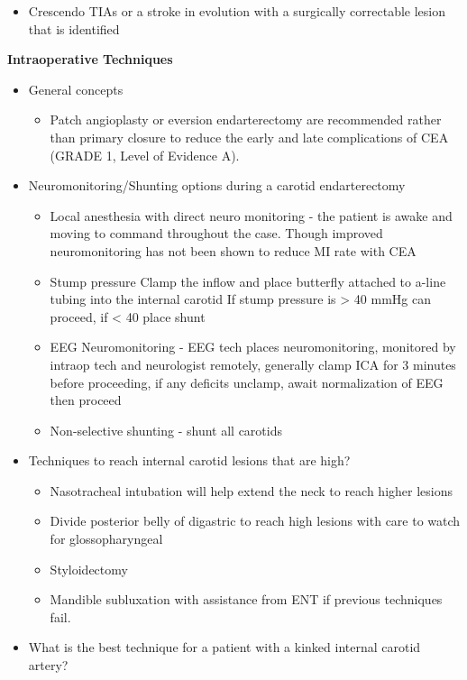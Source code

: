\documentclass[
]{book}
\providecommand{\tightlist}{%
  \setlength{\itemsep}{0pt}\setlength{\parskip}{0pt}}
\begin{document}
\begin{itemize}
  \begin{itemize}
  \tightlist
  \item
    Crescendo TIAs or a stroke in evolution with a surgically
    correctable lesion that is identified
  \end{itemize}
\end{itemize}

\textbf{Intraoperative Techniques}

\begin{itemize}
\item
  General concepts

  \begin{itemize}
  \tightlist
  \item
    Patch angioplasty or eversion endarterectomy are recommended
    rather than primary closure to reduce the early and late
    complications of CEA (GRADE 1, Level of Evidence A).
  \end{itemize}
\item
  Neuromonitoring/Shunting options during a carotid endarterectomy

  \begin{itemize}
  \item
    Local anesthesia with direct neuro monitoring - the patient is
    awake and moving to command throughout the case. Though improved
    neuromonitoring has not been shown to reduce MI rate with CEA
  \item
    Stump pressure Clamp the inflow and place butterfly attached to
    a-line tubing into the internal carotid If stump pressure is \textgreater{}
    40 mmHg can proceed, if \textless{} 40 place shunt
  \item
    EEG Neuromonitoring - EEG tech places neuromonitoring, monitored
    by intraop tech and neurologist remotely, generally clamp ICA
    for 3 minutes before proceeding, if any deficits unclamp, await
    normalization of EEG then proceed
  \item
    Non-selective shunting - shunt all carotids
  \end{itemize}
\item
  Techniques to reach internal carotid lesions that are high?

  \begin{itemize}
  \item
    Nasotracheal intubation will help extend the neck to reach
    higher lesions
  \item
    Divide posterior belly of digastric to reach high lesions with
    care to watch for glossopharyngeal
  \item
    Styloidectomy
  \item
    Mandible subluxation with assistance from ENT if previous
    techniques fail.
  \end{itemize}
\item
  What is the best technique for a patient with a kinked internal
  carotid artery?


\end{itemize}
\end{document}
